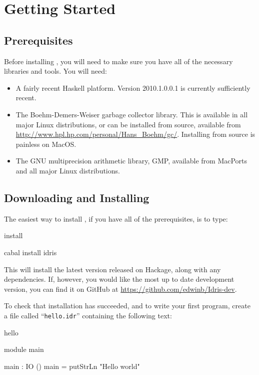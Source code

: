 \section{Getting Started}

\subsection{Prerequisites} 

Before installing \Idris{}, you will need to make sure you have all of the necessary
libraries and tools. You will need:

\begin{itemize}
\item A fairly recent Haskell platform. Version 2010.1.0.0.1 is currently
sufficiently recent.
\item The Boehm-Demers-Weiser garbage collector library. This is available in
all major Linux distributions, or can be installed from source, available
from \url{http://www.hpl.hp.com/personal/Hans_Boehm/gc/}. Installing from
source is painless on MacOS.
\item The GNU multiprecision arithmetic library, GMP, available from MacPorts and
all major Linux distributions.
\end{itemize}

\subsection{Downloading and Installing}

The easiest way to install \Idris{}, if you have all of the prerequisites, is to type:

\begin{SaveVerbatim}{install}

cabal install idris

\end{SaveVerbatim}

\noindent
This will install the latest version released on Hackage, along with any dependencies. 
If, however, you would like the most up
to date development version, you can find it on GitHub at
\url{https://github.com/edwinb/Idris-dev}.

To check that installation has succeeded, and to write your first \Idris{}
program, create a file called ``\texttt{hello.idr}'' containing the following
text:

\begin{SaveVerbatim}{hello}

module main

main : IO ()
main = putStrLn "Hello world"

\end{SaveVerbatim}

